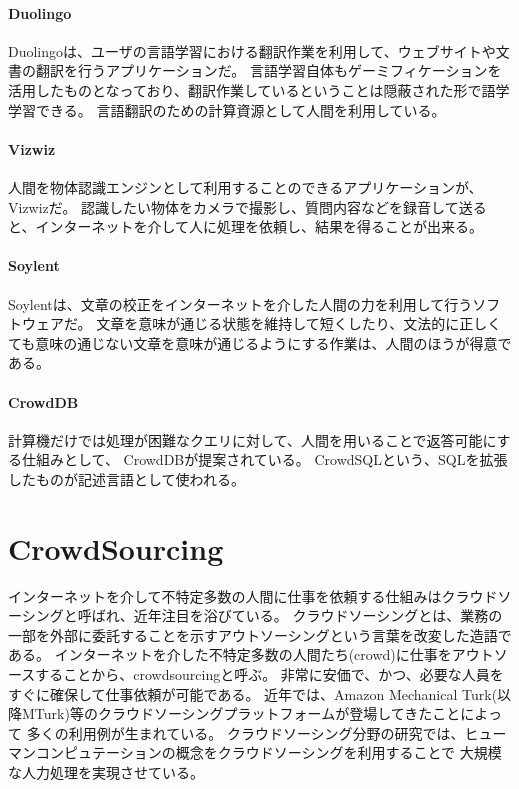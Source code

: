 \paragraph{Duolingo}\label{duolingo}

\mbox{}

Duolingo\cite{duolingo}は、ユーザの言語学習における翻訳作業を利用して、ウェブサイトや文書の翻訳を行うアプリケーションだ。
言語学習自体もゲーミフィケーションを活用したものとなっており、翻訳作業しているということは隠蔽された形で語学学習できる。
言語翻訳のための計算資源として人間を利用している。

\paragraph{Vizwiz}\label{vizwiz}

\mbox{}

人間を物体認識エンジンとして利用することのできるアプリケーションが、Vizwiz\cite{vizwiz}だ。
認識したい物体をカメラで撮影し、質問内容などを録音して送ると、インターネットを介して人に処理を依頼し、結果を得ることが出来る。

\paragraph{Soylent}\label{soylent}

\mbox{}

Soylent\cite{soylent}は、文章の校正をインターネットを介した人間の力を利用して行うソフトウェアだ。
文章を意味が通じる状態を維持して短くしたり、文法的に正しくても意味の通じない文章を意味が通じるようにする作業は、人間のほうが得意である。

\paragraph{CrowdDB}\label{crowddb}

\mbox{}

計算機だけでは処理が困難なクエリに対して、人間を用いることで返答可能にする仕組みとして、
CrowdDB\cite{crowddb}が提案されている。
CrowdSQLという、SQLを拡張したものが記述言語として使われる。

\section{CrowdSourcing}\label{crowdsourcing}

インターネットを介して不特定多数の人間に仕事を依頼する仕組みはクラウドソーシングと呼ばれ、近年注目を浴びている。
クラウドソーシングとは、業務の一部を外部に委託することを示すアウトソーシングという言葉を改変した造語である\cite{riseofcrowdsourcing}。
インターネットを介した不特定多数の人間たち(crowd)に仕事をアウトソースすることから、crowdsourcingと呼ぶ。
非常に安価で、かつ、必要な人員をすぐに確保して仕事依頼が可能である。
近年では、Amazon Mechanical
Turk\cite{amt}(以降MTurk)等のクラウドソーシングプラットフォームが登場してきたことによって
多くの利用例が生まれている。
クラウドソーシング分野の研究では、ヒューマンコンピュテーションの概念をクラウドソーシングを利用することで
大規模な人力処理を実現させている。

